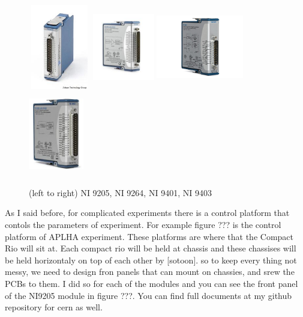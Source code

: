 \documentclass[12pt,a4paper]{article}
\begin{document}
\begin{figure}
\centering
\includegraphics[width=27mm, height=37mm]{ni9205}
\includegraphics[width=27mm, height=37mm]{ni9264}
\includegraphics[width=38mm, height=37mm]{ni9401}
\includegraphics[width=24mm, height=37mm]{ni9403}
\caption{(left to right) NI 9205, NI 9264, NI 9401, NI 9403}
\end{figure}

As I said before, for complicated experiments there is a control platform that contols the parameters of experiment. For example figure ??? is the control platform of APLHA experiment.
These platforms are where that the Compact Rio will sit at. Each compact rio will be held at chassis and these chassises will be held horizontaly on top of each other by [sotoon]. so to keep every thing not messy, we need to design fron panels that can mount on chassies, and srew the PCBs to them. I did so for each of the modules and you can see the front panel of the NI9205 module in figure ???. You can find full documents at my github repository for cern as well.
\end{document}
